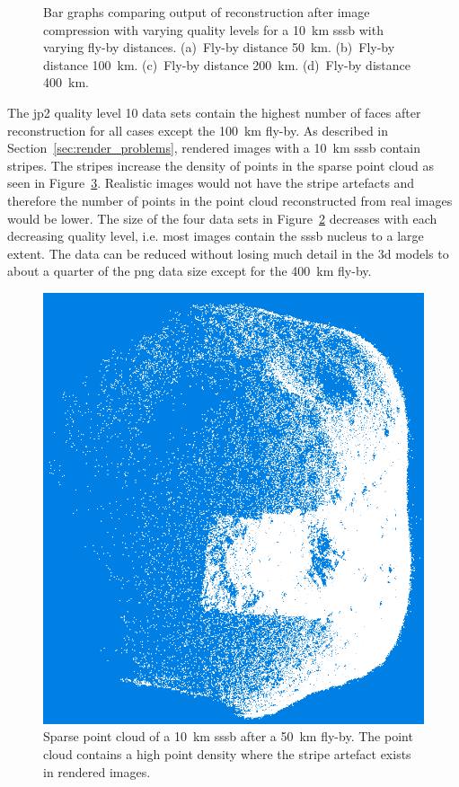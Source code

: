 \begin{figure}[htb]
\begin{subfigure}[b]{0.49\textwidth}
            \caption{}
            \label{fig:recon_120_400_10}
        \end{subfigure}
    \caption{Bar graphs comparing output of reconstruction after image compression with varying quality levels for a \SI{10}{\kilo\meter} \gls{sssb} with varying fly-by distances. (a)~Fly-by distance \SI{50}{\kilo\meter}. (b)~Fly-by distance \SI{100}{\kilo\meter}. (c)~Fly-by distance \SI{200}{\kilo\meter}. (d)~Fly-by distance \SI{400}{\kilo\meter}.}
    \label{fig:recon_stats_10}
\end{figure}

The \gls{jp2} quality level 10 data sets contain the highest number of faces after reconstruction for all cases except the \SI{100}{\kilo\meter} fly-by. As described in Section~\ref{sec:render_problems}, rendered images with a \SI{10}{\kilo\meter} \gls{sssb} contain stripes. The stripes increase the density of points in the sparse point cloud as seen in Figure~\ref{fig:point_cloud_stripe}. Realistic images would not have the stripe artefacts and therefore the number of points in the point cloud reconstructed from real images would be lower. The size of the four data sets in Figure~\ref{fig:recon_stats_10} decreases with each decreasing quality level, i.e. most images contain the \gls{sssb} nucleus to a large extent. The data can be reduced without losing much detail in the \gls{3d} models to about a quarter of the \gls{png} data size except for the \SI{400}{\kilo\meter} fly-by.

\begin{figure}[htb]
    \centering
    \includegraphics[width=.6\textwidth]{doc/thesis/0_figures/models_quality/50_10/120_50_10_point1.png}
    \caption{Sparse point cloud of a \SI{10}{\kilo\meter} \gls{sssb} after a \SI{50}{\kilo\meter} fly-by. The point cloud contains a high point density where the stripe artefact exists in rendered images.}
    \label{fig:point_cloud_stripe}
\end{figure}

